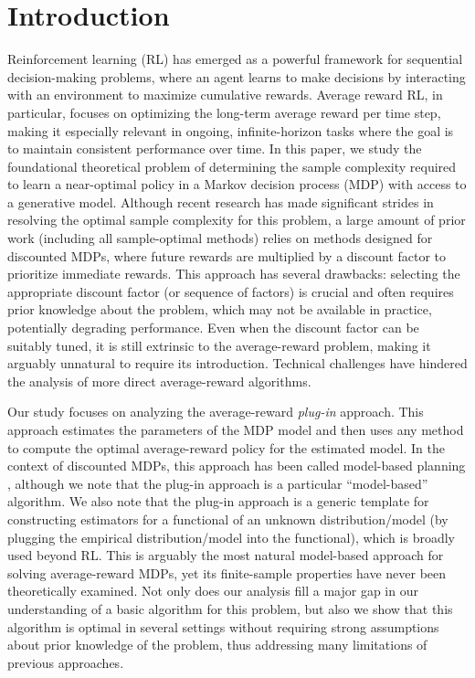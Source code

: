 \documentclass{article}
\theoremstyle{plain}
\theoremstyle{plain}
\theoremstyle{remark}
\theoremstyle{plain}
\theoremstyle{plain}
\newcommand{\plugin}{plug-in\xspace}
\begin{document}
\section{Introduction}
Reinforcement learning (RL) has emerged as a powerful framework for sequential decision-making problems, where an agent learns to make decisions by interacting with an environment to maximize cumulative rewards. Average reward RL, in particular, focuses on optimizing the long-term average reward per time step, making it especially relevant in ongoing, infinite-horizon tasks where the goal is to maintain consistent performance over time.
In this paper, we study the foundational theoretical problem of determining the sample complexity required to learn a near-optimal policy in a Markov decision process (MDP) with access to a generative model. Although recent research has made significant strides in resolving the optimal sample complexity for this problem, a large amount of prior work (including all sample-optimal methods) relies on methods designed for discounted MDPs, where future rewards are multiplied by a discount factor to prioritize immediate rewards. This approach has several drawbacks: selecting the appropriate discount factor (or sequence of factors) is crucial and often requires prior knowledge about the problem, which may not be available in practice, potentially degrading performance. Even when the discount factor can be suitably tuned, it is still extrinsic to the average-reward problem, making it arguably unnatural to require its introduction. Technical challenges have hindered the analysis of more direct average-reward algorithms. 

Our study focuses on analyzing the average-reward \emph{\plugin} approach. This approach estimates the parameters of the MDP model and then uses any method to compute the optimal average-reward policy for the estimated model. In the context of discounted MDPs, this approach has been called model-based planning \citep{agarwal_model-based_2020, li_breaking_2020}, although we note that the \plugin approach is a particular ``model-based'' algorithm. We also note that the \plugin approach is a generic template for constructing estimators for a functional of an unknown distribution/model (by plugging the empirical distribution/model into the functional), which is broadly used beyond RL.
This is arguably the most natural model-based approach for solving average-reward MDPs, yet its finite-sample properties have never been theoretically examined. Not only does our analysis fill a major gap in our understanding of a basic algorithm for this problem, but also we show that this algorithm is optimal in several settings without requiring strong assumptions about prior knowledge of the problem, thus addressing many limitations of previous approaches. 
\end{document}
